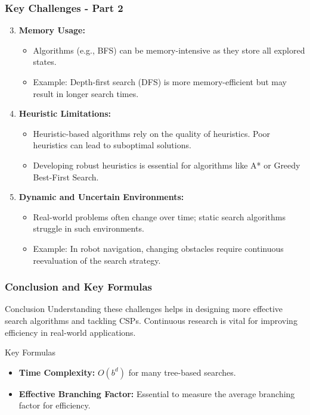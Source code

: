 \documentclass[aspectratio=169]{beamer}
\begin{document}
\begin{frame}[fragile]
    \frametitle{Key Challenges - Part 2}
    \begin{enumerate}
        \setcounter{enumi}{2}
        \item \textbf{Memory Usage:}
        \begin{itemize}
            \item Algorithms (e.g., BFS) can be memory-intensive as they store all explored states.
            \item Example: Depth-first search (DFS) is more memory-efficient but may result in longer search times.
        \end{itemize}
        
        \item \textbf{Heuristic Limitations:}
        \begin{itemize}
            \item Heuristic-based algorithms rely on the quality of heuristics. Poor heuristics can lead to suboptimal solutions.
            \item Developing robust heuristics is essential for algorithms like A* or Greedy Best-First Search.
        \end{itemize}

        \item \textbf{Dynamic and Uncertain Environments:}
        \begin{itemize}
            \item Real-world problems often change over time; static search algorithms struggle in such environments.
            \item Example: In robot navigation, changing obstacles require continuous reevaluation of the search strategy.
        \end{itemize}
    \end{enumerate}
\end{frame}

\begin{frame}[fragile]
    \frametitle{Conclusion and Key Formulas}
    \begin{block}{Conclusion}
        Understanding these challenges helps in designing more effective search algorithms and tackling CSPs. Continuous research is vital for improving efficiency in real-world applications.
    \end{block}
    
    \begin{block}{Key Formulas}
        \begin{itemize}
            \item \textbf{Time Complexity:} \( O(b^d) \) for many tree-based searches.
            \item \textbf{Effective Branching Factor:} Essential to measure the average branching factor for efficiency.
        \end{itemize}
    \end{block}
\end{frame}
\end{document}

